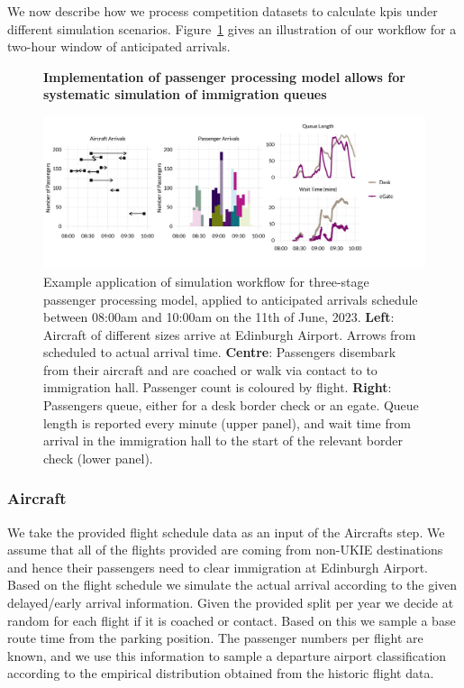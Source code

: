 \documentclass[10pt]{article}
\newcommand*{\figuretitle}[1]{%
    {\centering%
    \textbf{#1}%
    \par\medskip}%
}
\begin{document}
We now describe how we process competition datasets to calculate \glspl{kpi} under different simulation scenarios. Figure~\ref{fig:workflow_fig} gives an illustration of our workflow for a two-hour window of anticipated arrivals. 
\begin{figure}[!ht]
    \centering
    \figuretitle{Implementation of passenger processing model allows for systematic simulation of immigration queues}
    \includegraphics[width=1.1\textwidth]{figures/workflow_fig.png}
     \caption{Example application of simulation workflow for three-stage passenger processing model, applied to anticipated arrivals schedule between 08:00am and 10:00am on the 11th of June, 2023. \textbf{Left}: Aircraft of different sizes arrive at Edinburgh Airport. Arrows from scheduled to actual arrival time. \textbf{Centre}: Passengers disembark from their aircraft and are coached or walk via contact to to immigration hall. Passenger count is coloured by flight. \textbf{Right}: Passengers queue, either for a desk border check or an \gls{egate}. Queue length is reported every minute (upper panel), and wait time from arrival in the immigration hall to the start of the relevant border check (lower panel).} \label{fig:workflow_fig}
\end{figure}
\subsubsection{Aircraft}
We take the provided flight schedule data as an input of the Aircrafts step. We assume that all of the flights provided are coming from non-UKIE destinations and hence their passengers need to clear immigration at Edinburgh Airport. Based on the flight schedule we simulate the actual arrival according to the given delayed/early arrival information. Given the provided split per year we decide at random for each flight if it is coached or contact. Based on this we sample a base route time from the parking position. The passenger numbers per flight are known, and we use this information to sample a departure airport classification according to the empirical distribution obtained from the historic flight data.
\end{document}
